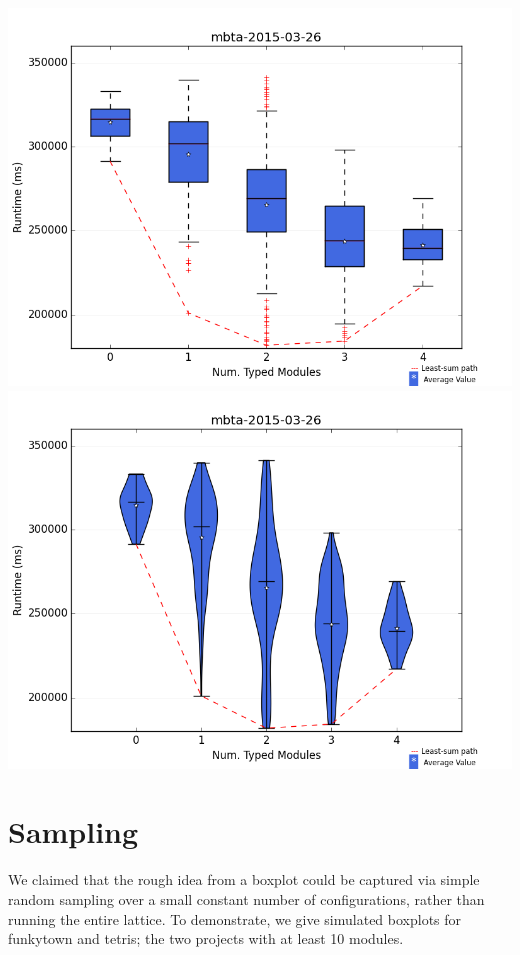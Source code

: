 \documentclass{article}
\begin{document}
\newpage
\includegraphics[width=\textwidth]{boxplots/mbta-2015-03-26-boxplot.png}
\includegraphics[width=\textwidth]{violins/mbta-2015-03-26-violin.png}
\newpage


\section{Sampling}
We claimed that the rough idea from a boxplot could be captured via simple random sampling over a small constant number of configurations, rather than running the entire lattice.
To demonstrate, we give simulated boxplots for funkytown and tetris; the two projects with at least 10 modules.
\end{document}
